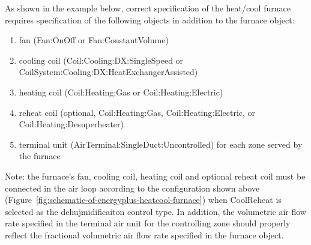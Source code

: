 As shown in the example below, correct specification of the heat/cool furnace requires specification of the following objects in addition to the furnace object:

\begin{enumerate}
\def\labelenumi{\arabic{enumi})}
\item
  fan (Fan:OnOff or Fan:ConstantVolume)
\item
  cooling coil (Coil:Cooling:DX:SingleSpeed or CoilSystem:Cooling:DX:HeatExchangerAssisted)
\item
  heating coil (Coil:Heating:Gas or Coil:Heating:Electric)
\item
  reheat coil (optional, Coil:Heating:Gas, Coil:Heating:Electric, or Coil:Heating:Desuperheater)
\item
  terminal unit (AirTerminal:SingleDuct:Uncontrolled) for each zone served by the furnace
\end{enumerate}

Note: the furnace's fan, cooling coil, heating coil and optional reheat coil must be connected in the air loop according to the configuration shown above (Figure~\ref{fig:schematic-of-energyplus-heatcool-furnace}) when CoolReheat is selected as the dehujmidificaiton control type. In addition, the volumetric air flow rate specified in the terminal air unit for the controlling zone should properly reflect the fractional volumetric air flow rate specified in the furnace object.

